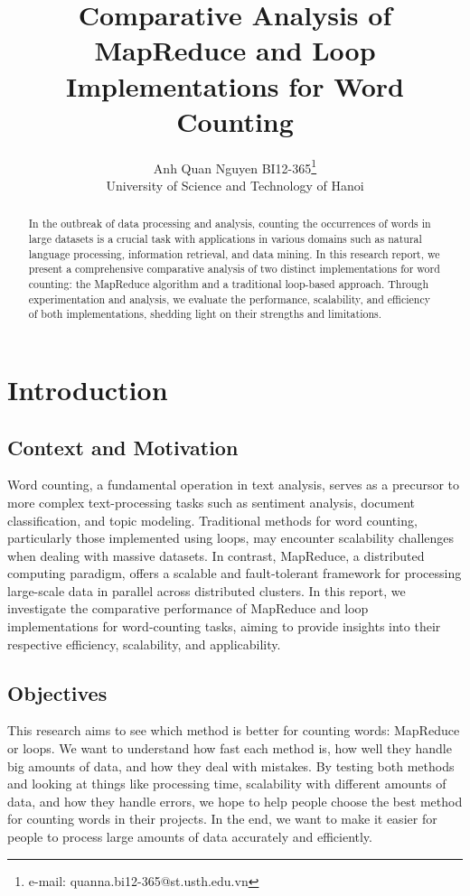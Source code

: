 \documentclass[]{acmsiggraph}
\title{Comparative Analysis of MapReduce and Loop Implementations for Word Counting}
\author{Anh Quan Nguyen BI12-365\thanks{e-mail: quanna.bi12-365@st.usth.edu.vn}\\University of Science and Technology of Hanoi}
\begin{document}
\maketitle


\begin{abstract}
In the outbreak of data processing and analysis, counting the occurrences of words in large datasets is a crucial task with applications in various domains such as natural language processing, information retrieval, and data mining. In this research report, we present a comprehensive comparative analysis of two distinct implementations for word counting: the MapReduce algorithm and a traditional loop-based approach. Through experimentation and analysis, we evaluate the performance, scalability, and efficiency of both implementations, shedding light on their strengths and limitations.
\end{abstract}

\section{Introduction}

\subsection{Context and Motivation}
Word counting, a fundamental operation in text analysis, serves as a precursor to more complex text-processing tasks such as sentiment analysis, document classification, and topic modeling. Traditional methods for word counting, particularly those implemented using loops, may encounter scalability challenges when dealing with massive datasets. In contrast, MapReduce, a distributed computing paradigm, offers a scalable and fault-tolerant framework for processing large-scale data in parallel across distributed clusters. In this report, we investigate the comparative performance of MapReduce and loop implementations for word-counting tasks, aiming to provide insights into their respective efficiency, scalability, and applicability.

\subsection{Objectives}
This research aims to see which method is better for counting words: MapReduce or loops. We want to understand how fast each method is, how well they handle big amounts of data, and how they deal with mistakes. By testing both methods and looking at things like processing time, scalability with different amounts of data, and how they handle errors, we hope to help people choose the best method for counting words in their projects. In the end, we want to make it easier for people to process large amounts of data accurately and efficiently.
\end{document}
